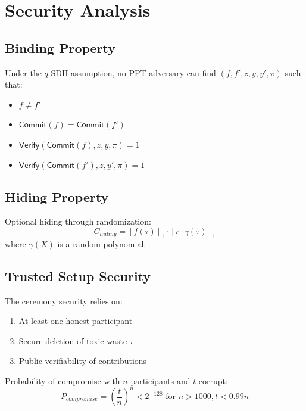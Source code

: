 \section{Security Analysis}


\subsection{Binding Property}

\begin{theorem}
Under the $q$-SDH assumption, no PPT adversary can find $(f, f', z, y, y', \pi)$ such that:
\begin{itemize}
    \item $f \neq f'$
    \item $\mathsf{Commit}(f) = \mathsf{Commit}(f')$
    \item $\mathsf{Verify}(\mathsf{Commit}(f), z, y, \pi) = 1$
    \item $\mathsf{Verify}(\mathsf{Commit}(f'), z, y', \pi) = 1$
\end{itemize}
\end{theorem}

\subsection{Hiding Property}

Optional hiding through randomization:
\begin{equation}
    C_{hiding} = [f(\tau)]_1 \cdot [r \cdot \gamma(\tau)]_1
\end{equation}
where $\gamma(X)$ is a random polynomial.

\subsection{Trusted Setup Security}

The ceremony security relies on:
\begin{enumerate}
    \item At least one honest participant
    \item Secure deletion of toxic waste $\tau$
    \item Public verifiability of contributions
\end{enumerate}

Probability of compromise with $n$ participants and $t$ corrupt:
\begin{equation}
    P_{compromise} = \left(\frac{t}{n}\right)^n < 2^{-128} \text{ for } n > 1000, t < 0.99n
\end{equation}

